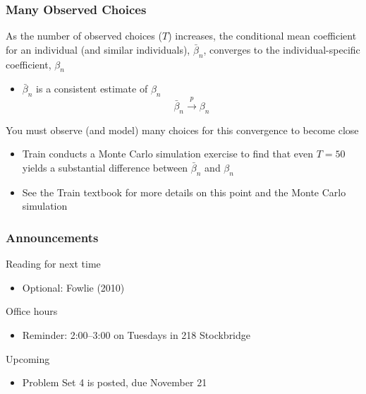 \documentclass{beamer}\usepackage[]{graphicx}\usepackage[]{color}
\begin{document}
\begin{frame}\frametitle{Many Observed Choices}
    As the number of observed choices ($T$) increases, the conditional mean coefficient for an individual (and similar individuals), $\bar{\beta}_n$, converges to the individual-specific coefficient, $\beta_n$
    \begin{itemize}
    	\item $\bar{\beta}_n$ is a consistent estimate of $\beta_n$
    	$$\bar{\beta}_n \overset{p}{\rightarrow} \beta_n$$
    \end{itemize}
    \vspace{3ex}
    You must observe (and model) many choices for this convergence to become close
    \begin{itemize}
    	\item Train conducts a Monte Carlo simulation exercise to find that even $T = 50$ yields a substantial difference between $\bar{\beta}_n$ and $\beta_n$
    	\item See the Train textbook for more details on this point and the Monte Carlo simulation
    \end{itemize}
\end{frame}

\begin{frame}\frametitle{Announcements}
    Reading for next time
    \begin{itemize}
        \item Optional: Fowlie (2010)
    \end{itemize}
    \vspace{3ex}
    Office hours
    \begin{itemize}
    	\item Reminder: 2:00--3:00 on Tuesdays in 218 Stockbridge
    \end{itemize}
    \vspace{3ex}
    Upcoming
    \begin{itemize}
        \item Problem Set 4 is posted, due November 21
    \end{itemize}
\end{frame}
\end{document}
